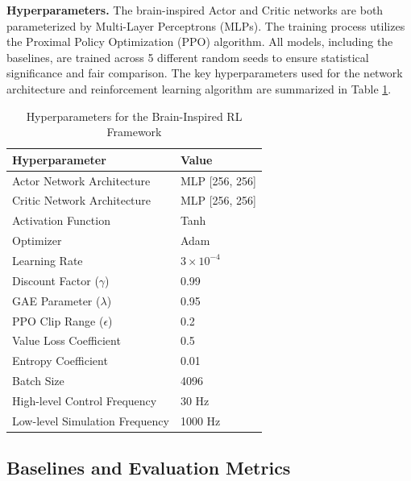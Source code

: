 \documentclass[lettersize,journal]{IEEEtran}
\begin{document}
\textbf{Hyperparameters.} The brain-inspired Actor and Critic networks are both parameterized by Multi-Layer Perceptrons (MLPs). 
The training process utilizes the Proximal Policy Optimization (PPO) algorithm. 
All models, including the baselines, are trained across 5 different random seeds to ensure statistical significance and fair comparison. 
The key hyperparameters used for the network architecture and reinforcement learning algorithm are summarized in Table \ref{tab:hyperparameters}.

\begin{table}[htbp]
\centering
\caption{Hyperparameters for the Brain-Inspired RL Framework}
\label{tab:hyperparameters}
\begin{tabular}{@{}ll@{}}
\toprule
\textbf{Hyperparameter} & \textbf{Value} \\ \midrule
Actor Network Architecture & MLP [256, 256] \\
Critic Network Architecture & MLP [256, 256] \\
Activation Function & Tanh \\
Optimizer & Adam \\
Learning Rate & $3 \times 10^{-4}$ \\
Discount Factor ($\gamma$) & 0.99 \\
GAE Parameter ($\lambda$) & 0.95 \\
PPO Clip Range ($\epsilon$) & 0.2 \\
Value Loss Coefficient & 0.5 \\
Entropy Coefficient & 0.01 \\
Batch Size & 4096 \\
High-level Control Frequency & 30 Hz \\
Low-level Simulation Frequency & 1000 Hz \\ \bottomrule
\end{tabular}
\end{table}

\subsection{Baselines and Evaluation Metrics}
\end{document}
